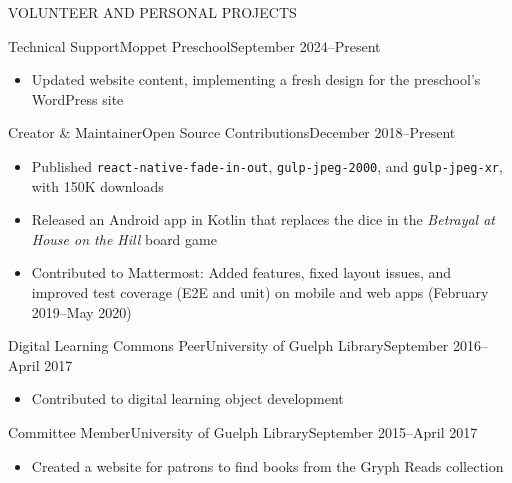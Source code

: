 \documentclass[]{mcdowellcv}
\begin{document}
\begin{cvsection}{VOLUNTEER AND PERSONAL PROJECTS}

  \begin{cvsubsection}{Technical Support}{Moppet Preschool}{September 2024--Present}
    \begin{itemize}
      \item Updated website content, implementing a fresh design for the preschool's
            WordPress site
    \end{itemize}
  \end{cvsubsection}

  \begin{cvsubsection}{Creator \& Maintainer}{Open Source Contributions}{December 2018--Present}
    \begin{itemize}
      \item Published \texttt{react-native-fade-in-out}, \texttt{gulp-jpeg-2000}, and
            \texttt{gulp-jpeg-xr}, with 150K downloads
      \item Released an Android app in Kotlin that replaces the dice in the
            \textit{Betrayal at House on the Hill} board game
      \item Contributed to Mattermost: Added features, fixed layout issues, and improved
            test coverage (E2E and unit) on mobile and web apps (February 2019–May 2020)
    \end{itemize}
  \end{cvsubsection}

  \begin{cvsubsection}{Digital Learning Commons Peer}{University of Guelph Library}{September 2016--April 2017}
    \begin{itemize}

      \item Contributed to digital learning object development
    \end{itemize}
  \end{cvsubsection}

  \begin{cvsubsection}{Committee Member}{University of Guelph Library}{September 2015--April 2017}
    \begin{itemize}
      \item Created a website for patrons to find books from the Gryph Reads collection
    \end{itemize}
  \end{cvsubsection}



\end{cvsection}
\end{document}
